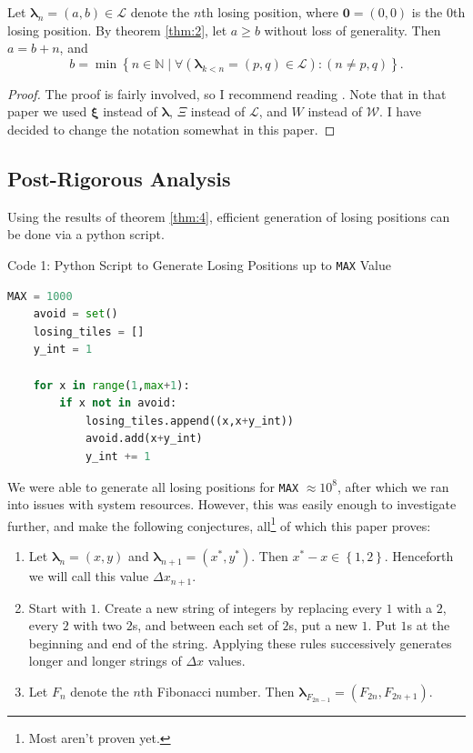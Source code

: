 \documentclass[11pt, letterpaper]{article}
\begin{document}
\begin{theorem}\label{thm:4}
	Let $\boldsymbol{\lambda}_{n}=(a,b)\in \mathcal{L} $ denote the $n$th losing position, where $\mathbf{0}=(0,0)$ is the $0$th losing position. By theorem \ref{thm:2}, let $a\geq b$ without loss of generality. Then $a=b+n$, and
	\[
		b=\min \left\{ n\in\mathbb{N} \mid \forall \left( \boldsymbol{\lambda}_{k<n}=(p,q)\in\mathcal{L}  \right) :\left( n\neq p,q \right)  \right\} 
	.\]
\end{theorem}
\begin{proof}
	The proof is fairly involved, so I recommend reading \cite{exc}. Note that in that paper we used $\boldsymbol{\xi} $ instead of $\boldsymbol{\lambda} $, $\Xi $ instead of $\mathcal{L} $, and $W$ instead of $\mathcal{W} $. I have decided to change the notation somewhat in this paper.
\end{proof}
\subsection{Post-Rigorous Analysis}
Using the results of theorem \ref{thm:4}, efficient generation of losing positions can be done via a python script.
\begin{center}
	Code 1: Python Script to Generate Losing Positions up to \verb|MAX| Value\label{code:1}
\end{center}
\begin{lstlisting}[language=Python]
	MAX = 1000
	avoid = set()
	losing_tiles = []
	y_int = 1

	for x in range(1,max+1):
		if x not in avoid:
			losing_tiles.append((x,x+y_int))
			avoid.add(x+y_int)
			y_int += 1
\end{lstlisting}
We were able to generate all losing positions for \verb|MAX| $\approx 10^8$, after which we ran into issues with system resources. However, this was easily enough to investigate further, and make the following conjectures, all\footnote{Most aren't proven yet.} of which this paper proves:
\begin{enumerate}
	\item Let $\boldsymbol{\lambda}_n=(x,y)$ and $\boldsymbol{\lambda}_{n+1}=(x^*,y^*)$. Then $x^*-x\in\left\{ 1,2 \right\} $. Henceforth we will call this value $\Delta x_{n+1}$.
	\item Start with $1$. Create a new string of integers by replacing every $1$ with a $2$, every $2$ with two $2$s, and between each set of $2$s, put a new $1$. Put $1$s at the beginning and end of the string. Applying these rules successively generates longer and longer strings of $\Delta x$ values.
	\item Let $F_n$ denote the $n$th Fibonacci number. Then $\boldsymbol{\lambda}_{F_{2n-1}}=\left( F_{2n},F_{2n+1} \right) $.
\end{enumerate}
\end{document}
